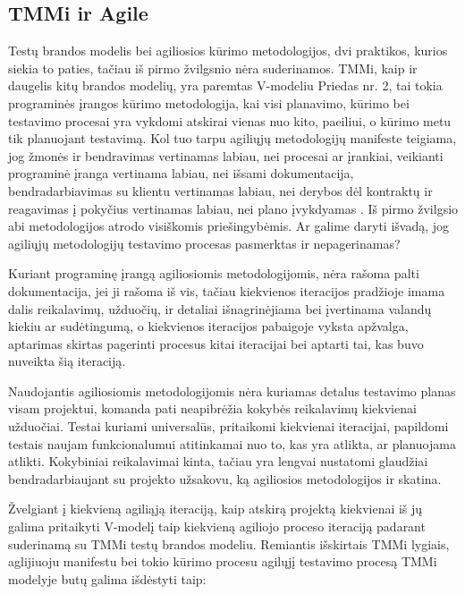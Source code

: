 \documentclass{VUMIFPSkursinis}
\begin{document}
\subsection{TMMi ir Agile}
Testų brandos modelis bei agiliosios kūrimo metodologijos, dvi praktikos, kurios siekia to paties, tačiau iš pirmo žvilgsnio nėra suderinamos. TMMi, kaip ir daugelis kitų brandos modelių, yra paremtas V-modeliu Priedas nr. 2, tai tokia programinės įrangos kūrimo metodologija, kai visi planavimo, kūrimo bei testavimo procesai yra vykdomi atskirai vienas nuo kito, paeiliui, o kūrimo metu tik planuojant testavimą. Kol tuo tarpu agiliųjų metodologijų manifeste teigiama, jog žmonės ir bendravimas vertinamas labiau, nei procesai ar įrankiai, veikianti programinė įranga vertinama labiau, nei išsami dokumentacija, bendradarbiavimas su klientu vertinamas labiau, nei derybos dėl kontraktų ir reagavimas į pokyčius vertinamas labiau, nei plano įvykdyamas \cite{agile}. Iš pirmo žvilgsio abi metodologijos atrodo visiškomis priešingybėmis. Ar galime daryti išvadą, jog agiliųjų metodologijų testavimo procesas pasmerktas ir nepagerinamas?

Kuriant programinę įrangą agiliosiomis metodologijomis, nėra rašoma palti dokumentacija, jei ji rašoma iš vis, tačiau kiekvienos iteracijos pradžioje imama dalis reikalavimų, užduočių, ir detaliai išnagrinėjiama bei  įvertinama valandų kiekiu ar sudėtingumą, o kiekvienos iteracijos pabaigoje vyksta apžvalga, aptarimas skirtas pagerinti procesus kitai iteracijai bei aptarti tai, kas buvo nuveikta šią iteraciją.

Naudojantis agiliosiomis metodologijomis nėra kuriamas detalus testavimo planas visam projektui, komanda pati neapibrėžia kokybės reikalavimų kiekvienai užduočiai. Testai kuriami universalūs, pritaikomi kiekvienai iteracijai, papildomi testais naujam funkcionalumui atitinkamai nuo to, kas yra atlikta, ar planuojama atlikti. Kokybiniai reikalavimai kinta, tačiau yra lengvai nustatomi glaudžiai bendradarbiaujant su projekto užsakovu, ką agiliosios metodologijos ir skatina.

Žvelgiant į kiekvieną agiliąją iteraciją, kaip atskirą projektą kiekvienai iš jų galima pritaikyti V-modelį taip kiekvieną agiliojo proceso iteraciją padarant suderinamą su TMMi testų brandos modeliu. Remiantis išskirtais TMMi lygiais, aglijiuoju manifestu bei tokio kūrimo procesu agilųjį testavimo procesą TMMi modelyje butų galima išdėstyti taip:
\end{document}

